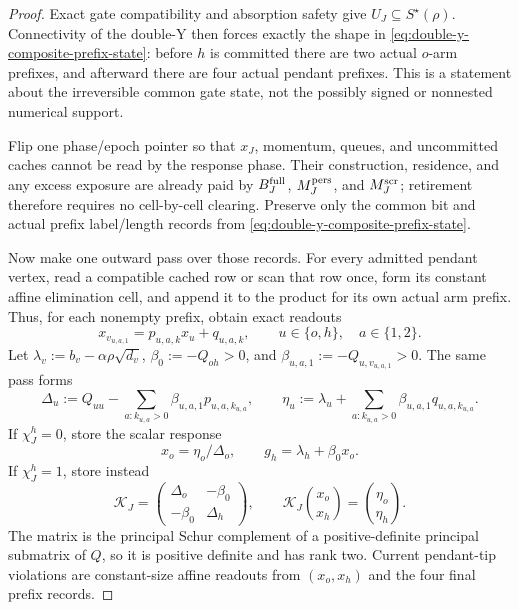 \begin{proof}
Exact gate compatibility and absorption safety give
$U_J\subseteq S^\star(\rho)$.  Connectivity of the double-Y then forces
exactly the shape in \cref{eq:double-y-composite-prefix-state}: before $h$ is
committed there are two actual $o$-arm prefixes, and afterward there are four
actual pendant prefixes.  This is a statement about the irreversible common
gate state, not the possibly signed or nonnested numerical support.

Flip one phase/epoch pointer so that $x_J$, momentum, queues, and uncommitted
caches cannot be read by the response phase.  Their construction, residence,
and any excess exposure are already paid by $B_J^{\rm full}$,
$M_J^{\rm pers}$, and $M_J^{\rm scr}$; retirement therefore requires no
cell-by-cell clearing.  Preserve only the common bit and actual prefix
label/length records from \cref{eq:double-y-composite-prefix-state}.

Now make one outward pass over those records.  For every admitted pendant
vertex, read a compatible cached row or scan that row once, form its constant
affine elimination cell, and append it to the product for its own actual arm
prefix.  Thus, for each nonempty prefix, obtain exact readouts
\begin{equation*}
 x_{v_{u,a,1}}=p_{u,a,k}x_u+q_{u,a,k},
 \qquad u\in\{o,h\},\quad a\in\{1,2\}.
\end{equation*}
Let $\lambda_v:=b_v-\alpha\rho\sqrt{d_v}$,
$\beta_0:=-Q_{oh}>0$, and
$\beta_{u,a,1}:=-Q_{u,v_{u,a,1}}>0$.  The same pass forms
\begin{equation}
 \Delta_u:=Q_{uu}-\sum_{a:k_{u,a}>0}
       \beta_{u,a,1}p_{u,a,k_{u,a}},
 \qquad
 \eta_u:=\lambda_u+\sum_{a:k_{u,a}>0}
       \beta_{u,a,1}q_{u,a,k_{u,a}}.
 \label{eq:double-y-composite-core-state}
\end{equation}
If $\chi_J^h=0$, store the scalar response
\begin{equation*}
 x_o=\eta_o/\Delta_o,
 \qquad g_h=\lambda_h+\beta_0x_o.
\end{equation*}
If $\chi_J^h=1$, store instead
\begin{equation*}
 \mathcal K_J=
 \begin{pmatrix}\Delta_o&-\beta_0\\-\beta_0&\Delta_h\end{pmatrix},
 \qquad
 \mathcal K_J\binom{x_o}{x_h}=\binom{\eta_o}{\eta_h}.
\end{equation*}
The matrix is the principal Schur complement of a positive-definite principal
submatrix of $Q$, so it is positive definite and has rank two.  Current
pendant-tip violations are constant-size affine readouts from $(x_o,x_h)$ and
the four final prefix records.


\end{proof}
